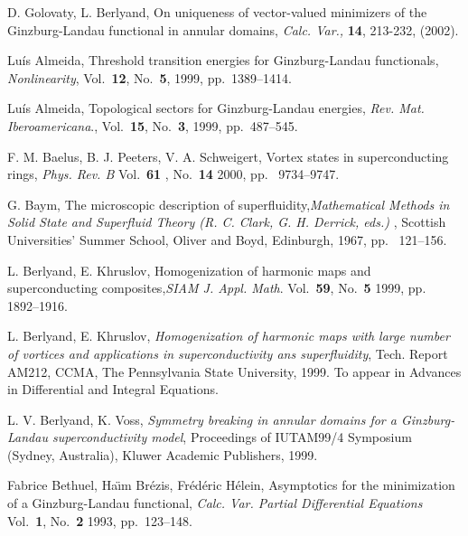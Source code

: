 \setLTRbibitems
\begin{thebibliography}{99}
\resetlatinfont
\bibitem{}
D. Golovaty, L. Berlyand, On uniqueness of vector-valued minimizers of the
Ginzburg-Landau functional in annular domains, {\it Calc. Var.,} {\bf 14}, 213-232, (2002).


Luís Almeida, Threshold transition energies for Ginzburg-Landau 
functionals, {\it Nonlinearity}, Vol.~{\bf 12}, No.~{\bf 5}, 1999, pp.~1389–1414.

Luís Almeida, Topological sectors for Ginzburg-Landau energies, {\it Rev. Mat. Iberoamericana}., 
Vol.~{\bf 15}, No.~{\bf 3}, 1999, pp.~487–545.


F. M. Baelus, B. J. Peeters, V. A. Schweigert, Vortex states in superconducting rings,
{\it Phys. Rev. B} Vol.~{\bf 61} , No.~{\bf 14} 2000, pp.~ 9734–9747.


G. Baym, The microscopic description of superfluidity,{\it  Mathematical Methods in Solid
State and Superfluid Theory (R. C. Clark, G. H. Derrick, eds.) }, Scottish Universities’
Summer School, Oliver and Boyd, Edinburgh, 1967, pp.~ 121–156.


L. Berlyand, E. Khruslov, Homogenization of harmonic maps and superconducting
composites,{\it  SIAM J. Appl. Math}. Vol.~{\bf 59}, No.~{\bf 5} 1999, pp.~ 1892–1916.


L. Berlyand, E. Khruslov, {\it Homogenization of harmonic maps with large number of
vortices and applications in superconductivity ans superfluidity}, Tech. Report AM212,
CCMA, The Pennsylvania State University, 1999. To appear in Advances in Differential
and Integral Equations.


L. V. Berlyand, K. Voss, {\it Symmetry breaking in annular domains for a Ginzburg-Landau
superconductivity model}, Proceedings of IUTAM99/4 Symposium (Sydney, Australia),
Kluwer Academic Publishers, 1999.

Fabrice Bethuel, Ha\"ım Br\'ezis, Fr\'ed\'eric H\'elein, Asymptotics for the minimization of
a Ginzburg-Landau functional, {\it Calc. Var. Partial Differential Equations} Vol.~{\bf 1}, No.~{\bf 2} 1993,
pp.~123–148.



\end{thebibliography}
